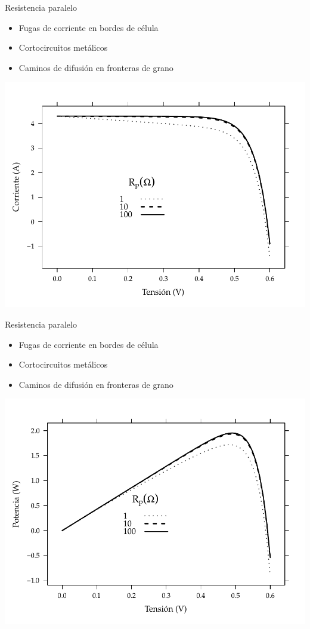 \documentclass[xcolor={usenames,svgnames,dvipsnames}]{beamer}
\begin{document}
\begin{frame}[label=sec-3-2-4]{Resistencia paralelo}
\begin{itemize}
\item Fugas de corriente en bordes de célula

\item Cortocircuitos metálicos

\item Caminos de difusión en fronteras de grano
\end{itemize}

\includegraphics[width=.9\linewidth]{../figs/InfluenciaRsh_IV.pdf}
\end{frame}

\begin{frame}[label=sec-3-2-5]{Resistencia paralelo}
\begin{itemize}
\item Fugas de corriente en bordes de célula

\item Cortocircuitos metálicos

\item Caminos de difusión en fronteras de grano
\end{itemize}

\includegraphics[width=.9\linewidth]{../figs/InfluenciaRsh_Potencia.pdf}
\end{frame}
\end{document}

